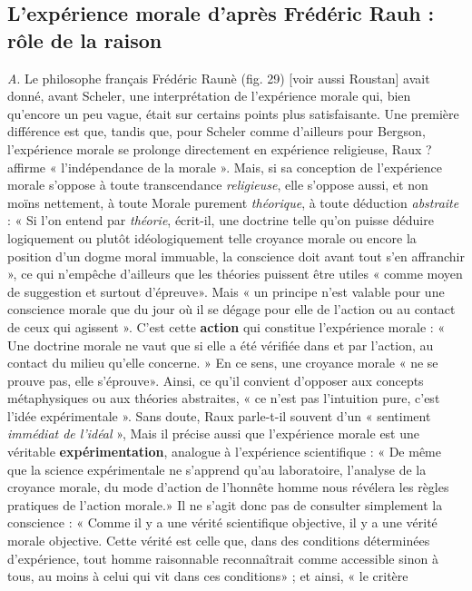 \subsection{L'expérience morale d’après Frédéric Rauh : rôle de
la raison}%
{\it A}. Le philosophe français Frédéric Raunè (fig. 29)
[voir aussi Roustan] avait donné, avant Scheler, une interprétation
de l’expérience morale qui, bien qu’encore un peu vague, était sur certains
points plus satisfaisante. Une première différence est que, tandis
que, pour Scheler comme d’ailleurs pour Bergson, l’expérience morale
se prolonge directement en expérience religieuse, Raux ? affirme « l’indépendance
de la morale ». Mais, si sa conception de l'expérience morale
s’oppose à toute transcendance {\it religieuse}, elle s’oppose aussi, et non
moïns nettement, à toute Morale purement {\it théorique}, à toute déduction
{\it abstraite} : « Si l’on entend par {\it théorie}, écrit-il, une doctrine telle qu’on
puisse déduire logiquement ou plutôt idéologiquement telle croyance
morale ou encore la position d’un dogme moral immuable, la conscience
doit avant tout s’en affranchir », ce qui n’empêche d’ailleurs que
les théories puissent être utiles « comme moyen de suggestion et surtout
d’épreuve». Mais « un principe n’est valable pour une
conscience morale que du jour où il se dégage pour elle de
l’action ou au contact de ceux qui agissent ». C’est cette {\bf action}
qui constitue l’expérience morale : « Une doctrine morale
ne vaut que si elle a été vérifiée dans et par l’action, au
contact du milieu qu’elle concerne. » En ce sens, une croyance
morale « ne se prouve pas, elle s’éprouve». Ainsi, ce qu’il convient
d’opposer aux concepts métaphysiques ou aux théories abstraites, « ce n’est pas
l'intuition pure, c’est l’idée expérimentale ». Sans doute,
Raux parle-t-il souvent d’un « sentiment {\it immédiat de l'idéal} »,
Mais il précise aussi que l’expérience morale est une véritable
{\bf expérimentation}, analogue à l'expérience scientifique : « De
même que la science expérimentale ne s’apprend qu’au laboratoire,
l’analyse de la croyance morale, du mode d’action de
l’honnête homme nous révélera les règles pratiques de l’action
morale.» Il ne s’agit donc pas de
consulter simplement la conscience : « Comme il y a une
vérité scientifique objective, il y a une vérité morale objective. Cette
vérité est celle que, dans des conditions déterminées d’expérience,
tout homme raisonnable reconnaîtrait comme accessible sinon à tous,
au moins à celui qui vit dans ces conditions» ; et ainsi, « le critère
